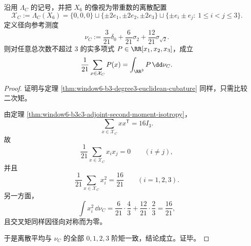 \begin{theorem}\label{thm:window6-c3-degree3-euclidean-cubature}
沿用 \(\Lambda_C\) 的记号，并把 \(X_6\) 的像视为带重数的离散配置
\[
\mathcal X_C:=\Lambda_C(X_6)
=
\{0,0,0\}\sqcup \{\pm 2e_1,\pm 2e_2,\pm 2e_3\}\sqcup \{\pm e_i\pm e_j:\ 1\le i<j\le 3\}.
\]
定义径向参考测度
\[
\nu_C:=\frac{3}{21}\delta_0+\frac{6}{21}\sigma_{2}+\frac{12}{21}\sigma_{\sqrt2}.
\]
则对任意总次数不超过 \(3\) 的实多项式 \(P\in\RR[x_1,x_2,x_3]\)，成立
\[
\frac1{21}\sum_{x\in \mathcal X_C}P(x)=\int_{\RR^3}P\,\dd\nu_C.
\]
\end{theorem}
\begin{proof}
证明与定理 \ref{thm:window6-b3-degree3-euclidean-cubature} 同样，只需比较二次矩。

由定理 \ref{thm:window6-b3c3-adjoint-second-moment-isotropy}，
\[
\sum_{x\in\mathcal X_C}xx^{\mathsf T}=16I_3.
\]
故
\[
\frac1{21}\sum_{x\in\mathcal X_C}x_ix_j=0
\qquad(i\neq j),
\]
并且
\[
\frac1{21}\sum_{x\in\mathcal X_C}x_i^2=\frac{16}{21}
\qquad(i=1,2,3).
\]
另一方面，
\[
\int x_i^2\,\dd\nu_C
=
\frac{6}{21}\cdot\frac{4}{3}+\frac{12}{21}\cdot\frac{2}{3}
=
\frac{16}{21},
\]
且交叉矩同样因径向对称而为零。

于是离散平均与 \(\nu_C\) 的全部 \(0,1,2,3\) 阶矩一致，结论成立。证毕。
\end{proof}

